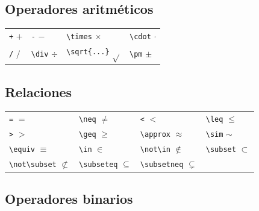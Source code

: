\documentclass[
  letterpaper,
  DIV=11,
  numbers=noendperiod]{scrreport}
\begin{document}
\hypertarget{operadores-aritmuxe9ticos}{%
\subsection{Operadores aritméticos}\label{operadores-aritmuxe9ticos}}

\begin{longtable}[]{@{}llll@{}}
\toprule()
\endhead
\texttt{+} \(+\) & \texttt{-} \(-\) & \texttt{\textbackslash{}times}
\(\times\) & \texttt{\textbackslash{}cdot} \(\cdot\) \\
\texttt{/} \(/\) & \texttt{\textbackslash{}div} \(\div\) &
\texttt{\textbackslash{}sqrt\{...\}} \(\sqrt{}\) &
\texttt{\textbackslash{}pm} \(\pm\) \\
\bottomrule()
\end{longtable}

\hypertarget{relaciones}{%
\subsection{Relaciones}\label{relaciones}}

\begin{longtable}[]{@{}
  >{\raggedright\arraybackslash}p{}
  >{\raggedright\arraybackslash}p{}
  >{\raggedright\arraybackslash}p{}
  >{\raggedright\arraybackslash}p{}@{}}
\toprule()
\endhead
\texttt{=} \(=\) & \texttt{\textbackslash{}neq} \(\neq\) &
\texttt{\textless{}} \(<\) & \texttt{\textbackslash{}leq} \(\leq\) \\
\texttt{\textgreater{}} \(>\) & \texttt{\textbackslash{}geq} \(\geq\) &
\texttt{\textbackslash{}approx} \(\approx\) &
\texttt{\textbackslash{}sim} \(\sim\) \\
\texttt{\textbackslash{}equiv} \(\equiv\) & \texttt{\textbackslash{}in}
\(\in\) & \texttt{\textbackslash{}not\textbackslash{}in} \(\not\in\) &
\texttt{\textbackslash{}subset} \(\subset\) \\
\texttt{\textbackslash{}not\textbackslash{}subset} \(\not\subset\) &
\texttt{\textbackslash{}subseteq} \(\subseteq\) &
\texttt{\textbackslash{}subsetneq} \(\subsetneq\) & \\
\bottomrule()
\end{longtable}

\hypertarget{operadores-binarios}{%
\subsection{Operadores binarios}\label{operadores-binarios}}
\end{document}
